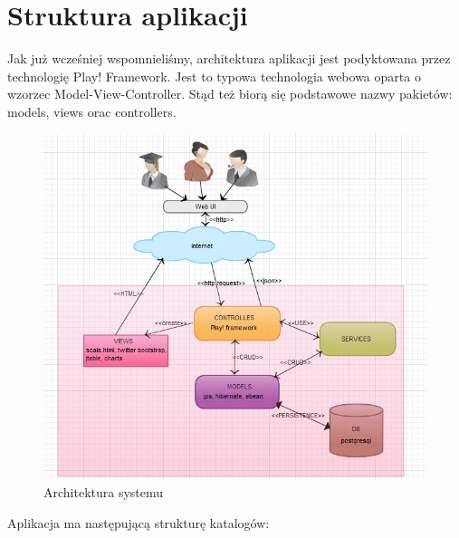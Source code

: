 \documentclass[a4paper,12pt,notitlepage]{mwrep}
\begin{document}
\section{Struktura aplikacji}
Jak już wcześniej wspomnieliśmy, architektura aplikacji jest podyktowana przez technologię Play! Framework. Jest to 
typowa technologia webowa oparta o wzorzec Model-View-Controller. Stąd też biorą się podstawowe nazwy pakietów: models, 
views orac controllers. \\
\begin{figure}[H]
\centering
\includegraphics[scale=1.0]{images/tasksArch.jpg}
\caption{Architektura systemu}
\label{fig:tasksArch}
\end{figure}

Aplikacja ma następującą strukturę katalogów:
\end{document}
